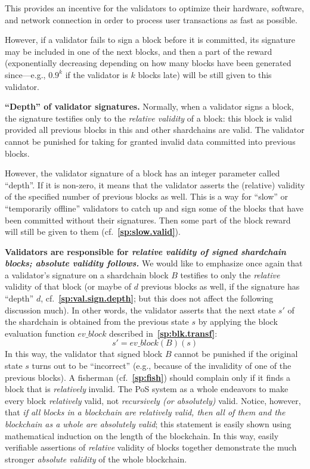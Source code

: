 \documentclass[12pt,oneside]{article}
\def\makepoint#1{\medbreak\noindent{\bf #1.\ }}
\def\nxsubpoint{\refstepcounter{subsubsection}%
  \smallbreak\makepoint{\thesubsubsection}}
\def\refpoint#1{{\rm\textbf{\ref{#1}}}}
\let\ptref=\refpoint
\def\embt(#1.){\textbf{#1.}}
\let\vr=\textit
\def\evblock{\vr{ev\_block}}
\begin{document}
This provides an incentive for the validators to optimize their
hardware, software, and network connection in order to process user
transactions as fast as possible.

However, if a validator fails to sign a block before it is committed,
its signature may be included in one of the next blocks, and then a
part of the reward (exponentially decreasing depending on how many
blocks have been generated since---e.g., $0.9^k$ if the validator is
$k$ blocks late) will be still given to this validator.

\nxsubpoint\label{sp:val.sign.depth} \embt(``Depth'' of validator
signatures.)  Normally, when a validator signs a block, the signature
testifies only to the {\em relative validity\/} of a block: this block
is valid provided all previous blocks in this and other shardchains
are valid. The validator cannot be punished for taking for granted
invalid data committed into previous blocks.

However, the validator signature of a block has an integer parameter
called ``depth''. If it is non-zero, it means that the validator
asserts the (relative) validity of the specified number of previous
blocks as well. This is a way for ``slow'' or ``temporarily offline''
validators to catch up and sign some of the blocks that have been
committed without their signatures. Then some part of the block reward
will still be given to them (cf.~\ptref{sp:slow.valid}).

\nxsubpoint\label{sp:abs.val.from.rel} \embt(Validators are
responsible for {\em relative\/} validity of signed shardchain blocks;
absolute validity follows.)  We would like to emphasize once again
that a validator's signature on a shardchain block $B$ testifies to
only the {\em relative\/} validity of that block (or maybe of $d$
previous blocks as well, if the signature has ``depth'' $d$,
cf.~\ptref{sp:val.sign.depth}; but this does not affect the following
discussion much). In other words, the validator asserts that the next
state $s'$ of the shardchain is obtained from the previous state $s$
by applying the block evaluation function $\evblock$ described
in~\ptref{sp:blk.transf}:
\begin{equation}\label{eq:ev.block.2}
  s'=\evblock(B)(s)
\end{equation}
In this way, the validator that signed block $B$ cannot be punished if
the original state $s$ turns out to be ``incorrect'' (e.g., because of
the invalidity of one of the previous blocks). A fisherman
(cf.~\ptref{sp:fish}) should complain only if it finds a block that is
{\em relatively\/} invalid. The PoS system as a whole endeavors to
make every block {\em relatively\/} valid, not {\em recursively (or
  absolutely)} valid. Notice, however, that {\em if all blocks in a
  blockchain are relatively valid, then all of them and the blockchain
  as a whole are absolutely valid}; this statement is easily shown
using mathematical induction on the length of the blockchain. In this
way, easily verifiable assertions of {\em relative\/} validity of
blocks together demonstrate the much stronger {\em absolute validity\/}
of the whole blockchain.
\end{document}
